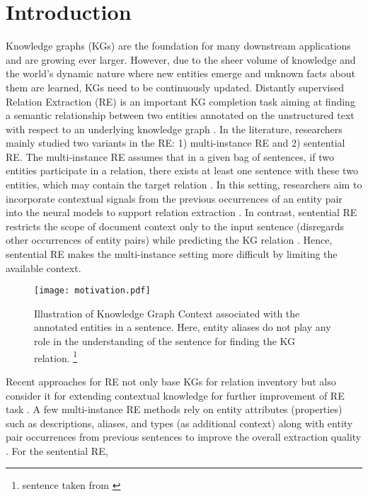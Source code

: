 \documentclass[11pt,a4paper]{article}
\begin{document}
\section{Introduction} \label{sec:introduction}
Knowledge graphs (KGs) are the foundation for many downstream applications and are growing ever larger. However, due to the sheer volume of knowledge and the world's dynamic nature where new entities emerge and unknown facts about them are learned, KGs need to be continuously updated.
Distantly supervised Relation Extraction (RE) is an important KG completion task aiming at finding a semantic relationship between two entities annotated on the unstructured text with respect to an underlying knowledge graph \cite{DBLP:conf/naacl/YeL19}.
In the literature, researchers mainly studied two variants in the RE: 1) multi-instance RE and 2) sentential RE. The multi-instance RE assumes that in a given bag of sentences, if two entities participate in a relation, there exists at least one sentence with these
two entities, which may contain the target relation \cite{DBLP:conf/pkdd/RiedelYM10,DBLP:conf/emnlp/VashishthJPBT18}.
In this setting, researchers aim to incorporate contextual signals from the previous occurrences of an entity pair into the neural models to support relation extraction \cite{DBLP:conf/naacl/YeL19,DBLP:conf/naacl/XuB19,DBLP:conf/aaai/WuFZ19}.
In contrast, sentential RE restricts the scope of document context only to the input sentence (disregards other occurrences of entity pairs) while predicting the KG relation \cite{DBLP:conf/emnlp/SorokinG17}. Hence, sentential RE makes the multi-instance setting more difficult by limiting the available context.\\
\begin{figure}[t]
\texttt{[image: motivation.pdf]}
\centering
\caption{Illustration of Knowledge Graph Context associated with the annotated entities in a sentence. Here, entity aliases do not play any role in the understanding of the sentence for finding the KG relation. \footnote{sentence taken from \cite{DBLP:conf/emnlp/SorokinG17}}}
\label{fig:motivation}
\end{figure}
Recent approaches for RE not only base KGs for relation inventory but also consider it for extending contextual knowledge for further improvement of RE task \cite{DBLP:conf/emnlp/VashishthJPBT18,bastos2020recon}.
A few multi-instance RE methods rely on entity attributes (properties) such as descriptions, aliases, and types (as additional context) along with entity pair occurrences from previous sentences to improve the overall extraction quality \cite{DBLP:conf/aaai/Ji0H017,DBLP:conf/emnlp/VashishthJPBT18}. For the sentential RE,
\end{document}
